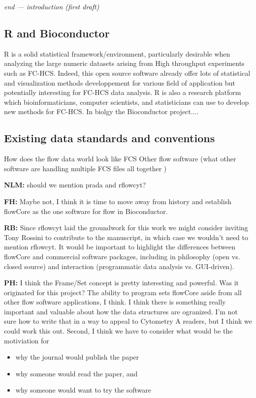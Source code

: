 \documentclass[12pt]{article}
\begin{document}
\textit{end --- introduction (first draft)}

\subsection{R and Bioconductor}

R is a solid statistical framework/environment, particularly desirable
when analyzing the large numeric datasets arising from High throughput
experiments such as FC-HCS. Indeed, this open source software already
offer lots of statistical and visualization methods developpement for
various field of application but potentially interesting for FC-HCS
data analysis. R is also a research platform which bioinformaticians,
computer scientists, and statisticians can use to develop new methods
for FC-HCS. In biolgy the Bioconductor project.... 
 

\subsection{Existing data standards and conventions}
How does the flow data world look like FCS Other flow software (what
other software are handling multiple FCS files all together ) 

{\bf NLM:} should we mention prada and rflowcyt?  

{\bf FH:} Maybe not, I think it is time to move away from history and
establish flowCore as the one software for flow in Bioconductor.

{\bf RB:} Since rflowcyt laid the groundwork for this work we might consider
inviting Tony Rossini to contribute to the manuscript, in which case we
wouldn't need to mention rflowcyt. It would be important to highlight
the differences between flowCore and commercial software packages,
including in philosophy (open vs. closed source) and interaction
(programmatic data analysis vs. GUI-driven). 

{\bf PH:} I think the Frame/Set concept is pretty interesting and
powerful. Was it originated for this project? The ability to program
sets flowCore aside from all other flow software applications, I
think. I think there is something really important and valuable about
how the data structures are ogranized. I'm not sure how to write that
in a way to appeal to Cytometry A readers, but I think we could work
this out. Second, I think we have to consider what would be the
motiviation for 
\begin{itemize}
\item why the journal would publish the paper 
\item why someone would read the paper, and
\item why someone would want to try the software
\end{itemize}
\end{document}
